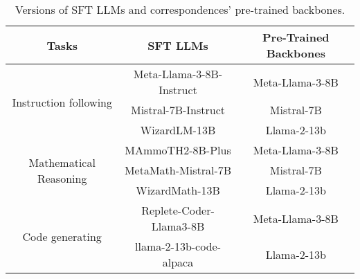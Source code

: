 \onecolumn
\begin{table}[htbp]
\centering
\caption{Versions of SFT LLMs and correspondences' pre-trained backbones.}
\label{tab:llms_SFT_backbone_correspondences}

\setlength{\tabcolsep}{2.0mm}
\begin{tabular}{c|c|c}
\hline
Tasks                                   & SFT LLMs                  & Pre-Trained Backbones       \\ \hline
\multirow{3}{*}{Instruction following}  & Meta-Llama-3-8B-Instruct\tablefootnote{\url{https://huggingface.co/meta-llama/Meta-Llama-3-8B-Instruct}}           & Meta-Llama-3-8B\tablefootnote{\url{https://huggingface.co/meta-llama/Meta-Llama-3-8B}}\saveFN{\llamaThreeThirteenBfn}          \\

                                        & Mistral-7B-Instruct\tablefootnote{\url{https://huggingface.co/mistralai/Mistral-7B-Instruct-v0.2}}           & Mistral-7B\tablefootnote{\url{https://huggingface.co/mistralai/Mistral-7B-v0.1}}\saveFN{\MistralSevenBfn}          \\
                                        
                                        & WizardLM-13B\tablefootnote{\url{https://huggingface.co/WizardLM/WizardLM-13B-V1.2}}           & Llama-2-13b\tablefootnote{\url{https://huggingface.co/meta-llama/Llama-2-13b-hf}}\saveFN{\llamaTwoThirteenBfn}          \\ \hline
                                        
\multirow{3}{*}{Mathematical Reasoning} & MAmmoTH2-8B-Plus\tablefootnote{\url{https://huggingface.co/TIGER-Lab/MAmmoTH2-8B-Plus}}           & Meta-Llama-3-8B\useFN{\llamaThreeThirteenBfn}          \\

                                        & MetaMath-Mistral-7B\tablefootnote{\url{https://huggingface.co/meta-math/MetaMath-Mistral-7B}}           & Mistral-7B\useFN{\MistralSevenBfn}          \\

                                        & WizardMath-13B\tablefootnote{\url{https://huggingface.co/WizardLM/WizardMath-13B-V1.0}}         & Llama-2-13b\useFN{\llamaTwoThirteenBfn}          \\ \hline
\multirow{2}{*}{Code generating}        & Replete-Coder-Llama3-8B\tablefootnote{\url{https://huggingface.co/Replete-AI/Replete-Coder-Llama3-8B}}           & Meta-Llama-3-8B\useFN{\llamaThreeThirteenBfn}          \\

                                        & llama-2-13b-code-alpaca\tablefootnote{\url{https://huggingface.co/layoric/llama-2-13b-code-alpaca}}     & Llama-2-13b\useFN{\llamaTwoThirteenBfn}           \\ \hline
\end{tabular}


\end{table}
